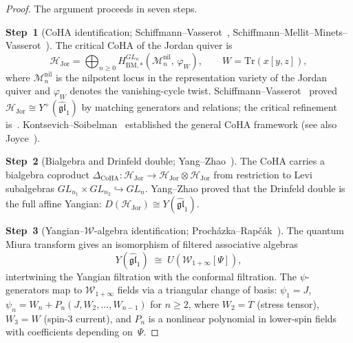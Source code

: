 \documentclass[11pt,reqno]{amsart}
\theoremstyle{definition}
\theoremstyle{remark}
\newcommand{\cH}{\mathcal{H}}
\newcommand{\cM}{\mathcal{M}}
\newcommand{\cW}{\mathcal{W}}
\numberwithin{equation}{section}
\begin{document}
\begin{proof}
The argument proceeds in seven steps.

\medskip
\noindent
\textbf{Step~1}
(CoHA identification;
Schiffmann--Vasserot~\cite{SV13},
Schiffmann--Mellit--Minets--Vasserot~\cite{SMMV23}).
The critical CoHA of the Jordan quiver is
\[
  \cH_{\mathrm{Jor}}
  = \bigoplus_{n \geq 0}
  H^{GL_n}_{\mathrm{BM},*}
  (\cM_n^{\mathrm{nil}},\, \varphi_W),
  \qquad
  W = \mathrm{Tr}(x[y,z]),
\]
where $\cM_n^{\mathrm{nil}}$ is the nilpotent locus in
the representation variety of the Jordan quiver and
$\varphi_W$ denotes the vanishing-cycle twist.
Schiffmann--Vasserot~\cite{SV13} proved
$\cH_{\mathrm{Jor}} \cong Y^+(\widehat{\mathfrak{gl}}_1)$
by matching generators and relations; the critical
refinement is~\cite{SMMV23}.
Kontsevich--Soibelman~\cite{KS11} established the general
CoHA framework (see also Joyce~\cite{Joyce18}).

\medskip
\noindent
\textbf{Step~2}
(Bialgebra and Drinfeld double; Yang--Zhao~\cite{YZ18a}).
The CoHA carries a bialgebra coproduct
$\Delta_{\mathrm{CoHA}} \colon
\cH_{\mathrm{Jor}} \to
\cH_{\mathrm{Jor}} \otimes \cH_{\mathrm{Jor}}$
from restriction to Levi subalgebras
$GL_{n_1} \times GL_{n_2} \hookrightarrow GL_n$.
Yang--Zhao proved that the Drinfeld double is the full
affine Yangian: $D(\cH_{\mathrm{Jor}}) \cong
Y(\widehat{\mathfrak{gl}}_1)$.

\medskip
\noindent
\textbf{Step~3}
(Yangian--$\cW$-algebra identification;
Proch\'azka--Rap\v{c}\'ak~\cite{PR19}).
The quantum Miura transform gives an isomorphism of
filtered associative algebras
\[
  Y(\widehat{\mathfrak{gl}}_1)
  \;\cong\;
  U(\cW_{1+\infty}[\Psi]),
\]
intertwining the Yangian filtration with the conformal
filtration. The $\psi$-generators map to
$\cW_{1+\infty}$ fields via a triangular change
of basis: $\psi_1 = J$,
$\psi_n = W_n + P_n(J, W_2, \ldots, W_{n-1})$
for $n \geq 2$, where $W_2 = T$ (stress tensor),
$W_3 = W$ (spin-$3$ current), and $P_n$ is a
nonlinear polynomial in lower-spin fields with
coefficients depending on~$\Psi$.


\end{proof}
\end{document}
